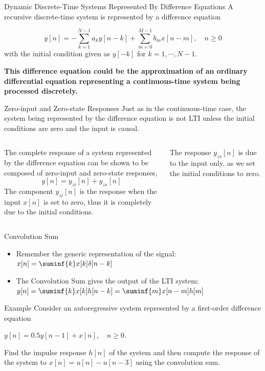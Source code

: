 \documentclass[aspectratio=169,xcolor=dvipsnames,svgnames,x11names,fleqn]{beamer}
\begin{document}
\begin{frame}{Dynamic Discrete-Time Systems Represented By Difference Equations}
    A recursive discrete-time system is represented by a difference equation

$$
y[n] = -\sum_{k=1}^{N-1}a_k y[n-k] + \sum_{m=0}^{M-1}b_m x[n-m], \quad n\geq 0
$$
with the initial condition given as $y[-k]$ for $k = 1, \cdots,  N - 1$.


\Large

\textbf{This difference equation could be the approximation of an ordinary differential equation representing a continuous-time system being processed discretely.}
\end{frame}

\begin{frame}{Zero-input and Zero-state Responses}
    Just as in the continuous-time case, the system being represented by the difference equation is not LTI unless the initial conditions are zero and the input is causal.

\vspace{15pt}

\begin{columns}
    The complete response of a system represented by the difference equation can be shown to be composed of zero-input and zero-state responses,
  $$
  y[n]= y_{zi}[n] + y_{zs}[n]
  $$  
  The component $y_{zi}[n]$ is the response when the input $x[n]$ is set to zero, thus it is completely due to the initial conditions. 

The response $y_{zs}[n]$ is due to the input only, as we set the initial conditions to zero.
\end{columns}
\end{frame}

\begin{frame}{Convolution Sum}
    
    \begin{itemize}
        \item     Remember the generic representation of the signal: $x[n] = \suminf{k}x[k]\delta[n-k]$
        \item The Convolution Sum gives the output of the LTI system: $y[n] = \suminf{k} x[k]h[n-k] = \suminf{m} x[n-m]h[m]$
    \end{itemize}
\end{frame}

\begin{frame}{Example}
    Consider an autoregressive system represented by a first-order difference equation
    
    $y[n] = 0.5y[n - 1] + x[n], \quad n \geq 0 $.

    Find the impulse response $h[n]$ of the system and then compute the response of the system to $x[n] = u[n] - u[n - 3]$ using the convolution sum.

    
\end{frame}
\end{document}
